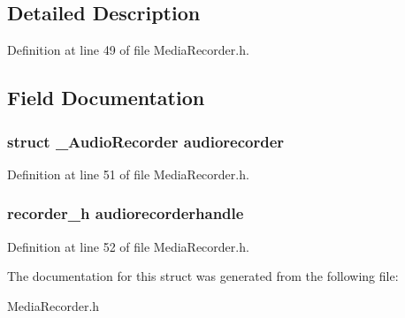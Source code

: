 \subsection{Detailed Description}


Definition at line 49 of file Media\-Recorder.\-h.



\subsection{Field Documentation}
\hypertarget{struct__AudioRecorderExtends_ac9cc91a707e660fb31213e8be119c816}{
\subsubsection[{audiorecorder}]{\setlength{\rightskip}{0pt plus 5cm}struct {\bf \-\_\-\-Audio\-Recorder} audiorecorder}}\label{struct__AudioRecorderExtends_ac9cc91a707e660fb31213e8be119c816}


Definition at line 51 of file Media\-Recorder.\-h.

\hypertarget{struct__AudioRecorderExtends_af08756e456b832eca1fd4a4d41bd75c2}{
\subsubsection[{audiorecorderhandle}]{\setlength{\rightskip}{0pt plus 5cm}recorder\-\_\-h audiorecorderhandle}}\label{struct__AudioRecorderExtends_af08756e456b832eca1fd4a4d41bd75c2}


Definition at line 52 of file Media\-Recorder.\-h.



The documentation for this struct was generated from the following file\-:\begin{DoxyCompactItemize}
\item 
Media\-Recorder.\-h\end{DoxyCompactItemize}
